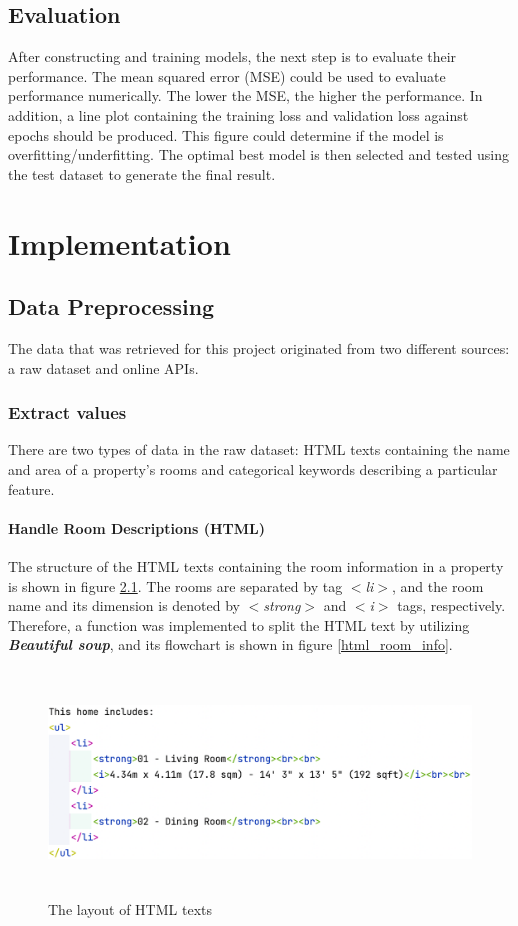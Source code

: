 \documentclass[12pt,twoside]{report}
\begin{document}
\section{Evaluation}
After constructing and training models, the next step is to evaluate their performance. The mean squared error (MSE) could be used to evaluate performance numerically. The lower the MSE, the higher the performance. In addition, a line plot containing the training loss and validation loss against epochs should be produced. This figure could determine if the model is overfitting/underfitting. The optimal best model is then selected and tested using the test dataset to generate the final result. 

\chapter{Implementation}
\section{Data Preprocessing}
The data that was retrieved for this project originated from two different sources: a raw dataset and online APIs. 

\subsection{Extract values}
There are two types of data in the raw dataset: HTML texts containing the name and area of a property's rooms and categorical keywords describing a particular feature.

\subsubsection{Handle Room Descriptions (HTML)}
The structure of the HTML texts containing the room information in a property is shown in figure \ref{html_structure}. The rooms are separated by tag \textit{$<$li$>$}, and the room name and its dimension is denoted by \textit{$<$strong$>$} and \textit{$<$i$>$} tags, respectively. Therefore, a function was implemented to split the HTML text by utilizing \textit{\textbf{Beautiful soup}}, and its flowchart is shown in figure \ref{html_room_info}.
\begin{figure}[h]
	\centering
	\includegraphics[width=15cm, height=6cm]{html_structure}
	\caption{The layout of HTML texts}
	\label{html_structure}
\end{figure}
\end{document}
